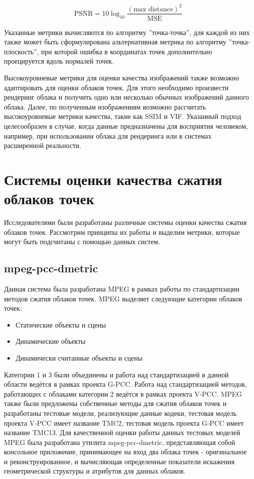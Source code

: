 \begin{equation} \label{eq:cloud_psnr}
    \text{PSNR} = 10\log_{10} \frac{\left(\text{max distance}\right)^{2}}{\text{MSE}}
\end{equation}

Указанные метрики вычисляются по алгоритму ''точка-точка'', для каждой из них
также может быть сформулирована альтернативная метрика по алгоритму
''точка-плоскость'', при которой ошибка в координатах точек дополнительно
проецируется вдоль нормалей точек.


Высокоуровневые метрики для оценки качества изображений также возможно
адаптировать для оценки облаков точек. Для этого необходимо произвести рендеринг
облака и получить одно или несколько обычных изображений данного облака. Далее,
по полученным изображениям возможно рассчитать высокоуровневые метрики качества,
такие как SSIM и VIF. Указанный подход целесообразен в случае, когда данные
предназначены для восприятия человеком, например, при использовании облака для
рендеринга или в системах расширенной реальности.

\section{Системы оценки качества сжатия облаков точек}

Исследователями были разработаны различные системы оценки качества сжатия
облаков точек. Рассмотрим принципы их работы и выделим метрики, которые могут
быть подсчитаны с помощью данных систем.

\subsection{mpeg-pcc-dmetric}

Данная система была разработана MPEG в рамках работы по стандартизации методов
сжатия облаков точек. MPEG выделяет следующие категории облаков
точек\cite{CallForProposalV2}:

\begin{itemize}
    \item Статические объекты и сцены
    \item Динамические объекты
    \item Динамически считанные объекты и сцены
\end{itemize}


Категории 1 и 3 были объединены и работа над стандартизацией в данной области
ведётся в рамках проекта G-PCC. Работа над стандартизацией методов, работающих с
облаками категории 2 ведётся в рамках проекта V-PCC. MPEG также были предложены
собственные методы для сжатия облаков точек и разработаны тестовые модели,
реализующие данные кодеки, тестовая модель проекта V-PCC имеет название TMC2,
тестовая модель проекта G-PCC имеет название TMC13. Для качественной оценки
работы данных тестовых моделей MPEG была разработана утилита mpeg-pcc-dmetric,
представляющая собой консольное приложение, принимающее на вход два облака точек
- оригинальное и реконструированное, и вычисляющая определенные показатели
искажения геометрической структуры и атрибутов для данных облаков.

